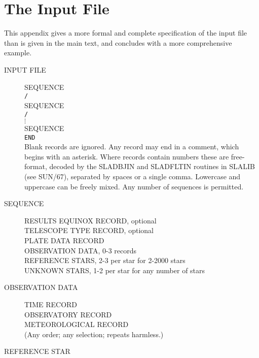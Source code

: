 \documentclass[twoside,11pt]{article}
\newcommand{\xref}[3]{#1}
\newcommand{\xlabel}[1]{}
\renewcommand{\_}{\texttt{\symbol{95}}}
\begin{document}
\newpage
\appendix
\section{\xlabel{appendix_the_input_file}The Input File}
\label{appendix_the_input_file}

This appendix gives a more formal and complete specification of
the input file than is given in the main text, and concludes
with a more comprehensive example.

\begin{description}

\item[\xlabel{INPUT_FILE}INPUT FILE]\mbox{}

 SEQUENCE \\
 \texttt{/} \\
 SEQUENCE \\
 \texttt{/} \\
 $\vdots$ \\
 SEQUENCE \\
 \texttt{END} \\
 Blank records are ignored.
 Any record may end in a comment, which begins with an asterisk.
 Where records contain numbers these are free-format, decoded by the
 \xref{SLA\_DBJIN}{sun67}{SLA_DBJIN} and \xref{SLA\_DFLTIN}{sun67}{SLA_DFLTIN}
 routines in \xref{SLALIB}{sun67}{} (see SUN/67), separated by spaces or a
 single comma.  Lowercase and uppercase can be freely mixed.
 Any number of sequences is permitted.

\goodbreak
\item[\xlabel{SEQUENCE}SEQUENCE]\mbox{}

 RESULTS EQUINOX RECORD, optional \\
 TELESCOPE TYPE RECORD, optional \\
 PLATE DATA RECORD \\
 OBSERVATION DATA, 0-3 records \\
 REFERENCE STARS, 2-3 per star for 2-2000 stars \\
 UNKNOWN STARS, 1-2 per star for any number of stars

\goodbreak
\item[\xlabel{OBSERVATION_DATA}OBSERVATION DATA]\mbox{}

 TIME RECORD \\
 OBSERVATORY RECORD \\
 METEOROLOGICAL RECORD \\
 (Any order; any selection; repeats harmless.)

\goodbreak
\item[\xlabel{REFERENCE_STAR}REFERENCE STAR]\mbox{}


\end{description}
\end{document}
